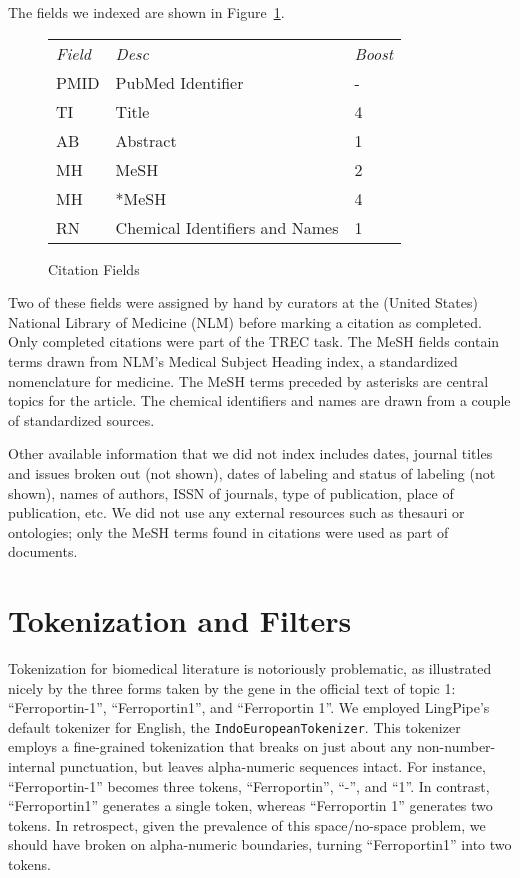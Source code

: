 \documentclass[11pt,oneside]{article}
\begin{document}
The fields we indexed are shown in Figure~\ref{fields-fig}.
%
\begin{figure}
\begin{center}
\begin{tabular}{lll}
{\it Field} & {\it Desc} & {\it Boost} \\
PMID & PubMed Identifier & - \\
TI   & Title & 4 \\
AB   & Abstract & 1 \\
MH   & MeSH  & 2 \\
MH   & *MeSH  & 4 \\
RN   & Chemical Identifiers and Names & 1 \\
\end{tabular}
\end{center}
\caption{Citation Fields}
\label{fields-fig}
\end{figure}
%
Two of these fields were assigned by hand by curators at the (United
States) National Library of Medicine (NLM) before marking a citation
as completed. Only completed citations were part of the TREC task.
The MeSH fields contain terms drawn from NLM's Medical Subject Heading
index, a standardized nomenclature for medicine.  The MeSH terms
preceded by asterisks are central topics for the article.  The
chemical identifiers and names are drawn from a couple of standardized
sources.

Other available information that we did not index includes dates,
journal titles and issues broken out (not shown), dates of labeling
and status of labeling (not shown), names of authors, ISSN of
journals, type of publication, place of publication, etc.  We did not
use any external resources such as thesauri or ontologies; only the
MeSH terms found in citations were used as part of documents.


\section*{Tokenization and Filters}

Tokenization for biomedical literature is notoriously problematic, as
illustrated nicely by the three forms taken by the gene in the
official text of topic 1: ``Ferroportin-1'', ``Ferroportin1'', and
``Ferroportin 1''.  We employed LingPipe's default tokenizer for
English, the {\tt IndoEuropeanTokenizer}.  This tokenizer employs a
fine-grained tokenization that breaks on just about any
non-number-internal punctuation, but leaves alpha-numeric sequences
intact.  For instance, ``Ferroportin-1'' becomes three tokens,
``Ferroportin'', ``-'', and ``1''.  In contrast, ``Ferroportin1''
generates a single token, whereas ``Ferroportin 1'' generates two
tokens.  In retrospect, given the prevalence of this space/no-space
problem, we should have broken on alpha-numeric boundaries, turning
``Ferroportin1'' into two tokens.
\end{document}
